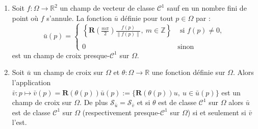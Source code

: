 \begin{proposition}
\label{prop:cont1}
\[\]
\vspace{-1cm}
\begin{enumerate}
\item Soit $f : \Omega \rightarrow \mathbb{R}^2$ un champ de vecteur de classe $\mathcal{C}^1$ sauf en un nombre fini de point où $f$ s'annule. La fonction $\bar{u}$ définie pour tout $p\in\Omega$ par :
\begin{equation}
    \bar{u}(p) =
\left\{
    \begin{array}{lc}
        \displaystyle\left\{\mathbf{R}\left(\frac{m\pi}{2}\right)\frac{f(p)}{\left\|f(p)\right\|},~ m\in \mathbb{Z}\right\} &\text{ si }f(p)\neq 0,\\\\
        0& \text{sinon}
    \end{array}
\right.
\label{eq:repr_to_cross}
\end{equation}
est un champ de croix presque-$\mathcal{C}^1$ sur $\Omega$.

\item Soit $\bar{u}$ un champ de croix sur $\Omega$ et $\theta : \Omega \rightarrow \mathbb{R}$ une fonction définie sur $\Omega$. Alors l'application $\bar{v}:p\mapsto \bar{v}(p)=\mathbf{R}(\theta(p))\bar{u}(p):=\{\mathbf{R}(\theta(p)) u,~u\in \bar{u}(p)\}$ est un champ de croix sur $\Omega$. De plus $\mathcal{S}_{\bar{u}}=\mathcal{S}_{\bar{v}}$ et si $\theta$ est de classe $\mathcal{C}^1$ sur $\Omega$ alors $\bar{u}$ est de classe $\mathcal{C}^1$ sur $\Omega$ (respectivement presque-$\mathcal{C}^1$ sur $\Omega$) si et seulement si $\bar{v}$ l'est.
\end{enumerate}
\end{proposition}

